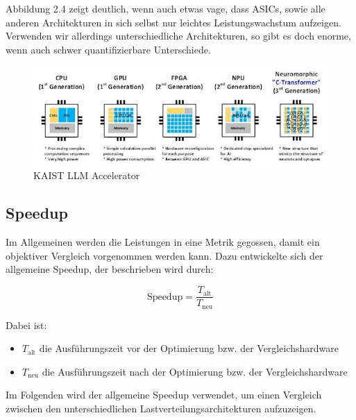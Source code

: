 Abbildung 2.4 zeigt deutlich, wenn auch etwas vage, dass ASICs, sowie alle anderen Architekturen in sich selbst nur leichtes Leistungswachstum aufzeigen. Verwenden wir allerdings unterschiedliche Architekturen, so gibt es doch enorme, wenn auch schwer quantifizierbare Unterschiede.
\begin{figure}
    \centering
    \includegraphics[width=0.8\linewidth]{images/lowpowerasic.png}
    \caption{KAIST LLM Accelerator}
    \label{fig:enter-label}
\end{figure}
\subsection{Speedup}
Im Allgemeinen werden die Leistungen in eine Metrik gegossen, damit ein objektiver Vergleich vorgenommen werden kann. Dazu entwickelte sich der allgemeine Speedup, der beschrieben wird durch:

\begin{equation}
\text{Speedup} = \frac{T_{\text{alt}}}{T_{\text{neu}}}
\end{equation}

Dabei ist:
\begin{itemize}
  \item $T_{\text{alt}}$ die Ausführungszeit vor der Optimierung bzw. der Vergleichshardware
  \item $T_{\text{neu}}$ die Ausführungszeit nach der Optimierung bzw. der Vergleichshardware
\end{itemize}
Im Folgenden wird der allgemeine Speedup verwendet, um einen Vergleich zwischen den unterschiedlichen Lastverteilungsarchitekturen aufzuzeigen.